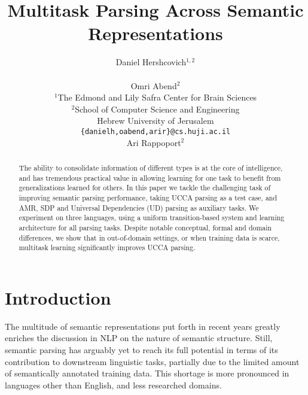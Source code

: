 \documentclass[11pt,a4paper]{article}
\title{Multitask Parsing Across Semantic Representations}
\author{Daniel Hershcovich$^{1,2}$ \\
  \\\And
  Omri Abend$^2$ \\
  $^1$The Edmond and Lily Safra Center for Brain Sciences \\
  $^2$School of Computer Science and Engineering \\
  Hebrew University of Jerusalem \\
  \texttt{\{danielh,oabend,arir\}@cs.huji.ac.il}
  \\\And
  Ari Rappoport$^2$
}
\date{}
\begin{document}
\maketitle

\begin{abstract}
  The ability to consolidate information of different types
  is at the core of intelligence, and has tremendous practical value
  in allowing learning for one task to benefit from generalizations learned for others.
  In this paper we
  tackle the challenging task of improving semantic parsing
  performance, taking UCCA
  parsing as a test case, 
  and AMR, SDP and Universal Dependencies (UD) parsing as auxiliary tasks.
  We experiment on three languages,
  using a uniform transition-based system and learning 
  architecture for all parsing tasks.
  Despite notable conceptual, formal and domain differences,
  we show that in out-of-domain settings, or when training data is scarce,
  multitask learning significantly improves UCCA parsing.
\end{abstract}

\section{Introduction}\label{sec:introduction}

The multitude of semantic representations put forth in recent years greatly enriches
the discussion in NLP on the nature of semantic structure.
Still, semantic parsing has arguably yet to reach its full 
potential in terms of its contribution to downstream linguistic tasks,
partially due to the limited amount of semantically annotated training data.
This shortage is more pronounced in 
languages other than English, and less researched domains.

\end{document}
